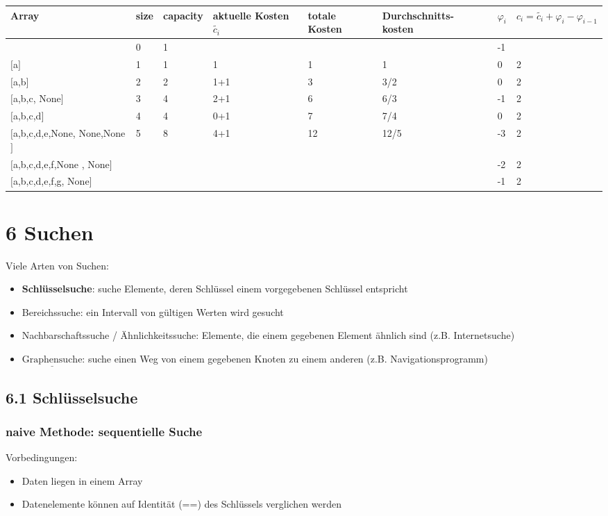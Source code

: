 \documentclass[11pt, fleqn]{scrreprt}
\begin{document}
\begin{tabular}{C{3cm} | C{0.5cm} C{1.5cm} | C{2cm} | C{1.5cm} | C{2.6cm}| C{1cm} | C{1.5cm}}
	Array & size & capacity & aktuelle Kosten $\tilde{c_i}$ & totale Kosten &  Durchschnitts- kosten & $\varphi_i$  & $c_i = \tilde{c_i} + \varphi_i - \varphi_{i-1}$\\\hline
	[None] & 0 & 1 & & & & -1 & \\
	$[$a$]$ & 1 & 1 & 1 & 1 & 1 & 0 & 2\\ 
	$[$a,b$]$ & 2 & 2 & 1+1 & 3 & 3/2 & 0 & 2\\ 
	$[$a,b,c, None$]$ & 3 & 4 & 2+1 & 6 & 6/3 & -1 & 2\\
	$[$a,b,c,d$]$ & 4 & 4 & 0+1 & 7 & 7/4 & 0 & 2\\
	$[$a,b,c,d,e,None, None,None$]$ & 5 & 8 & 4+1 & 12 & 12/5 & -3 & 2 \\
	$[$a,b,c,d,e,f,None , None$]$ & & & & &&-2 & 2\\
	$[$a,b,c,d,e,f,g, None$]$ & & & & && -1 & 2\\
	
\end{tabular}


\chapter*{6 Suchen}
Viele Arten von Suchen:
\begin{itemize}
	\item \textbf{Schlüsselsuche}: suche Elemente, deren Schlüssel einem vorgegebenen Schlüssel entspricht
	\item Bereichssuche: ein Intervall von gültigen Werten wird gesucht
	\item Nachbarschaftssuche / Ähnlichkeitssuche: Elemente, die einem gegebenen Element ähnlich sind (z.B. Internetsuche)
	\item $\underline{\text{Graphensuche}}$: suche einen Weg von einem gegebenen Knoten zu einem anderen (z.B. Navigationsprogramm)
\end{itemize}

\section*{6.1 Schlüsselsuche}

\subsection*{naive Methode: sequentielle Suche}
Vorbedingungen:
\begin{itemize}
	\item Daten liegen in einem Array
	\item Datenelemente können auf Identität (==) des Schlüssels verglichen werden
\end{itemize}
\end{document}
